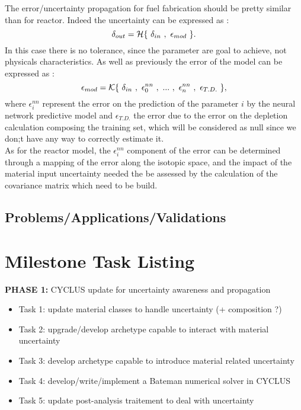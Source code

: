\documentclass[dvips,12pt]{article}
\begin{document}
The error/uncertainty propagation for fuel fabrication should be pretty similar than for reactor. Indeed the uncertainty can be expressed as :
\begin{equation}
\delta_{out} = {\cal H}\{~\delta _{in}~,~\epsilon_{mod}~\}.
\end{equation}
In this case there is no tolerance, since the parameter are goal to achieve, not physicals characteristics. As well as previously the error of the model can be expressed as :
\begin{equation}
\epsilon_{mod} = {\cal K}\{~\delta _{in}~,~\epsilon^{nn}_{0}~,~...~,~\epsilon^{nn}_{n}~,~\epsilon_{T.D.}~\},
\end{equation}
 where $\epsilon^{nn}_{i}$ represent the error on the prediction of the parameter $i$ by the neural network predictive model and $\epsilon_{T.D.}$ the error due to the error on the depletion calculation composing the training set, which will be considered as null since we don;t have any way to correctly estimate it.\\
 
 As for the reactor model, the $\epsilon^{nn}_{i}$ component of the error can be determined through a mapping of the error along the isotopic space, and the impact of the material input uncertainty needed the be assessed by the calculation of the covariance matrix which need to be build.

\subsection{Problems/Applications/Validations}


\pagebreak
\section{Milestone Task Listing}

\noindent\textbf{PHASE 1:} CYCLUS update for uncertainty awareness and propagation

\begin{itemize}
\item Task 1: update material classes to handle uncertainty (+ composition ?)
\item Task 2: upgrade/develop archetype capable to interact with material uncertainty
\item Task 3: develop archetype capable to introduce material related uncertainty
\item Task 4: develop/write/implement a Bateman numerical solver in CYCLUS
\item Task 5: update post-analysis traitement to deal with uncertainty  
\end{itemize}
 
\end{document}

